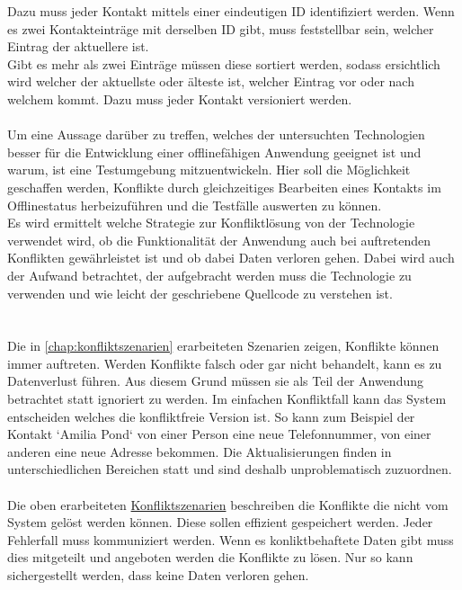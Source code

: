 Dazu muss jeder Kontakt mittels einer eindeutigen ID identifiziert werden. Wenn es zwei Kontakteinträge mit derselben ID gibt, muss feststellbar sein, welcher Eintrag der aktuellere ist.\\
Gibt es mehr als zwei Einträge müssen diese sortiert werden, sodass ersichtlich wird welcher der aktuellste oder älteste ist, welcher Eintrag vor oder nach welchem kommt. Dazu muss jeder Kontakt versioniert werden.\\\\
Um eine Aussage darüber zu treffen, welches der untersuchten Technologien besser für die Entwicklung einer offlinefähigen Anwendung geeignet ist und warum, ist eine Testumgebung mitzuentwickeln. Hier soll die Möglichkeit geschaffen werden, Konflikte durch gleichzeitiges Bearbeiten eines Kontakts im Offlinestatus herbeizuführen und die Testfälle auswerten zu können.\\
Es wird ermittelt welche Strategie zur Konfliktlösung von der Technologie verwendet wird, ob die Funktionalität der Anwendung auch bei auftretenden Konflikten gewährleistet ist und ob dabei Daten verloren gehen.
Dabei wird auch der Aufwand betrachtet, der aufgebracht werden muss die Technologie zu verwenden und wie leicht der geschriebene Quellcode zu verstehen ist.\\
\\\\
Die in \autoref{chap:konfliktszenarien} erarbeiteten Szenarien zeigen, Konflikte können immer auftreten. Werden Konflikte falsch oder gar nicht behandelt, kann es zu Datenverlust führen.
Aus diesem Grund müssen sie als Teil der Anwendung betrachtet statt ignoriert zu werden.
Im einfachen Konfliktfall kann das System entscheiden welches die konfliktfreie Version ist.
So kann zum Beispiel der Kontakt `Amilia Pond` von einer Person eine neue Telefonnummer, von einer anderen eine neue Adresse bekommen.
Die Aktualisierungen finden in unterschiedlichen Bereichen statt und sind deshalb unproblematisch zuzuordnen.\\\\
Die oben erarbeiteten \hyperref[chap:konfliktszenarien]{Konfliktszenarien} beschreiben die Konflikte die nicht vom System gelöst werden können.
Diese sollen effizient gespeichert werden.
Jeder Fehlerfall muss kommuniziert werden. Wenn es konliktbehaftete Daten gibt muss dies mitgeteilt und angeboten werden die Konflikte zu lösen. Nur so kann sichergestellt werden, dass keine Daten verloren gehen.